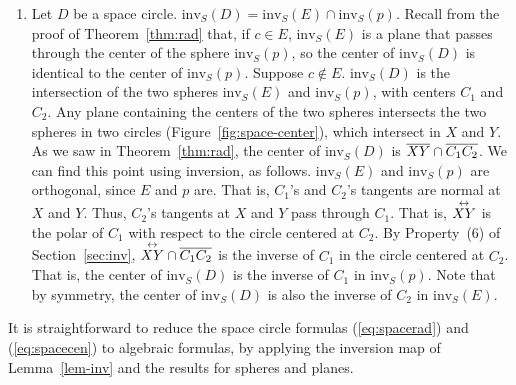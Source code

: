 \begin{enumerate}
\item
Let $D$ be a space circle.
$\mbox{inv}_{S}(D) = \mbox{inv}_{S}(E) \cap \mbox{inv}_{S}(p)$.
Recall from the proof of Theorem~\ref{thm:rad} that,
if $c \in E$, $\mbox{inv}_{S}(E)$ is a plane that passes 
through the center of the sphere $\mbox{inv}_{S}(p)$,
so the center of $\mbox{inv}_{S}(D)$ is identical to the center of  
$\mbox{inv}_{S}(p)$.
Suppose $c \not \in E$.
$\mbox{inv}_{S}(D)$ is the intersection of the two spheres $\mbox{inv}_{S}(E)$
and $\mbox{inv}_{S}(p)$,
with centers $C_1$ and $C_2$.
Any plane containing the centers of the two spheres 
intersects the two spheres in two circles (Figure~\ref{fig:space-center}),
which intersect in $X$ and $Y$.
As we saw in Theorem~\ref{thm:rad}, the center of $\mbox{inv}_S(D)$ is 
$\mbox{$\overline{XY}$} \cap \mbox{$\overline{C_{1}C_{2}}$}$.
We can find this point using inversion, as follows.
$\mbox{inv}_{S}(E)$ and $\mbox{inv}_{S}(p)$ are orthogonal,
since $E$ and $p$ are.
That is, $C_1$'s and $C_2$'s tangents are normal at $X$ and $Y$.
Thus, $C_2$'s tangents at $X$ and $Y$ pass through $C_{1}$.
That is, $\mbox{$\stackrel{\leftrightarrow}{XY}$}$ is the polar of $C_{1}$ with respect to the circle
centered at $C_{2}$.
By Property~(6) of Section~\ref{sec:inv},
$\mbox{$\stackrel{\leftrightarrow}{XY}$} \cap \mbox{$\overline{C_{1}C_{2}}$}$ is
the inverse of $C_{1}$ in the circle centered at $C_{2}$.
That is, the center of $\mbox{inv}_{S}(D)$ is the inverse of $C_1$ in
$\mbox{inv}_{S}(p)$.
Note that by symmetry, the center of $\mbox{inv}_{S}(D)$ is also the inverse 
of $C_2$ in
$\mbox{inv}_{S}(E)$.
\end{enumerate}
\QED


It is straightforward to reduce the space circle formulas 
(\ref{eq:spacerad}) and 
(\ref{eq:spacecen}) to algebraic formulas, by applying the inversion map 
of Lemma~\ref{lem-inv} and the results for spheres and planes.




